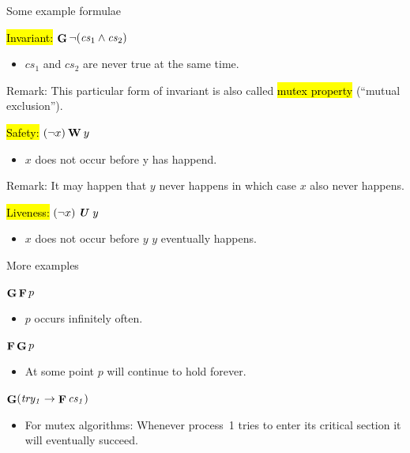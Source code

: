 \begin{frame}{Some example formulae}

\hl{Invariant:} $\mathop{\bf G}\nolimits \neg(\mathit{cs}_1 \wedge \mathit{cs}_2)$
\begin{itemize}
  \item $cs_1$ and $cs_2$ are never true at the same time.
\end{itemize}
Remark: This particular form of invariant is also called
  \hl{mutex property} (``mutual exclusion'').

\bigskip
\hl{Safety:} $(\neg x)\mathbin{\bf W} y$
\begin{itemize}
\item $x$ does not occur before y has happend.
\end{itemize}
Remark: It may happen that $y$ never happens in which case $x$
  also never happens.

\bigskip
\hl{Liveness:} $(\neg x)\hl{\U} y$
\begin{itemize}
\item $x$ does not occur before $y$
    $y$ eventually happens.
\end{itemize}

\end{frame}


\begin{frame}{More examples}

$\mathop{\bf G}\nolimits\mathop{\bf F}\nolimits p$
\begin{itemize}
\item $p$ occurs infinitely often.
\end{itemize}

$\mathop{\bf F}\nolimits\mathop{\bf G}\nolimits p$
\begin{itemize}
\item At some point $p$ will continue to hold forever.
\end{itemize}

$\mathop{\bf G}\nolimits (\mathit{try_1} \rightarrow \mathop{\bf F}\nolimits \mathit{cs_1})$
\begin{itemize}
\item For mutex algorithms: Whenever process~1 tries to enter its
   critical section it will eventually succeed.
\end{itemize}

\end{frame}


